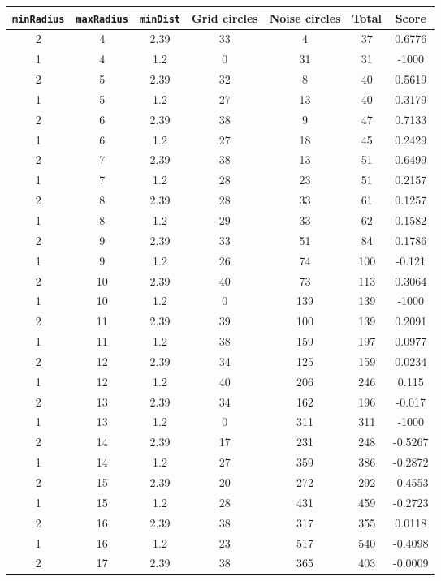 \documentclass[letterpaper, 12pt]{article}
\begin{document}
\begin{longtable}{|c|c|c|c|c|c|c|}
\hline
\textbf{\texttt{minRadius}} & \textbf{\texttt{maxRadius}} & \textbf{\texttt{minDist}} & \textbf{Grid circles} & \textbf{Noise circles} & \textbf{Total} & \textbf{Score} \\
\hline
2 & 4 & 2.39 & 33 & 4 & 37 & 0.6776 \\
\hline
1 & 4 & 1.2 & 0 & 31 & 31 & -1000 \\
\hline
2 & 5 & 2.39 & 32 & 8 & 40 & 0.5619 \\
\hline
1 & 5 & 1.2 & 27 & 13 & 40 & 0.3179 \\
\hline
2 & 6 & 2.39 & 38 & 9 & 47 & 0.7133 \\
\hline
1 & 6 & 1.2 & 27 & 18 & 45 & 0.2429 \\
\hline
2 & 7 & 2.39 & 38 & 13 & 51 & 0.6499 \\
\hline
1 & 7 & 1.2 & 28 & 23 & 51 & 0.2157 \\
\hline
2 & 8 & 2.39 & 28 & 33 & 61 & 0.1257 \\
\hline
1 & 8 & 1.2 & 29 & 33 & 62 & 0.1582 \\
\hline
2 & 9 & 2.39 & 33 & 51 & 84 & 0.1786 \\
\hline
1 & 9 & 1.2 & 26 & 74 & 100 & -0.121 \\
\hline
2 & 10 & 2.39 & 40 & 73 & 113 & 0.3064 \\
\hline
1 & 10 & 1.2 & 0 & 139 & 139 & -1000 \\
\hline
2 & 11 & 2.39 & 39 & 100 & 139 & 0.2091 \\
\hline
1 & 11 & 1.2 & 38 & 159 & 197 & 0.0977 \\
\hline
2 & 12 & 2.39 & 34 & 125 & 159 & 0.0234 \\
\hline
1 & 12 & 1.2 & 40 & 206 & 246 & 0.115 \\
\hline
2 & 13 & 2.39 & 34 & 162 & 196 & -0.017 \\
\hline
1 & 13 & 1.2 & 0 & 311 & 311 & -1000 \\
\hline
2 & 14 & 2.39 & 17 & 231 & 248 & -0.5267 \\
\hline
1 & 14 & 1.2 & 27 & 359 & 386 & -0.2872 \\
\hline
2 & 15 & 2.39 & 20 & 272 & 292 & -0.4553 \\
\hline
1 & 15 & 1.2 & 28 & 431 & 459 & -0.2723 \\
\hline
2 & 16 & 2.39 & 38 & 317 & 355 & 0.0118 \\
\hline
1 & 16 & 1.2 & 23 & 517 & 540 & -0.4098 \\
\hline
2 & 17 & 2.39 & 38 & 365 & 403 & -0.0009 \\

\end{longtable}
\end{document}

